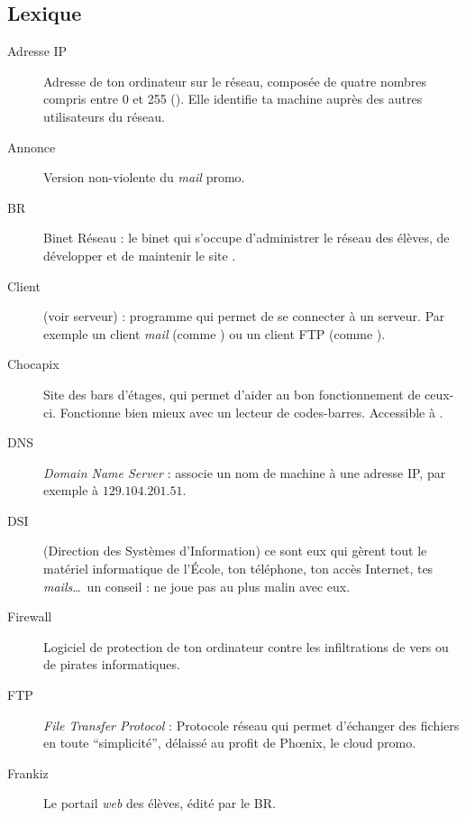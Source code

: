 \subsection{Lexique}


\begin{description}
  \item[Adresse IP] Adresse de ton ordinateur sur le réseau, composée de quatre nombres compris entre 0 et 255  (). Elle identifie ta machine auprès des autres utilisateurs du réseau.
  
  \item[Annonce] Version non-violente du \emph{mail} promo.
  
  \item[BR] Binet Réseau : le binet qui s'occupe d'administrer le réseau des élèves, de développer et de maintenir le site .

  \item[Client] (voir serveur) : programme qui permet de se connecter à un serveur. Par exemple un client \emph{mail}
	(comme ) ou un client FTP (comme ).

  \item[Chocapix] Site des bars d'étages, qui permet d'aider au bon fonctionnement de ceux-ci. Fonctionne bien mieux avec un lecteur de codes-barres. Accessible à .
  
  \item[DNS] \emph{Domain Name Server} : associe un nom de machine à une adresse IP, par exemple  à  $129.104.201.51$.
  
  \item[DSI] (Direction des Systèmes d'Information) ce sont eux qui gèrent tout le matériel informatique de l'École, ton téléphone, ton accès Internet, tes \emph{mails}\ldots\ un conseil : ne joue pas au plus malin avec eux.

  \item[Firewall] Logiciel de protection de ton ordinateur contre les infiltrations de vers ou de pirates informatiques.
  
  \item[FTP] \emph{File Transfer Protocol} : Protocole réseau qui permet d'échanger des fichiers en toute “simplicité”, délaissé au profit de Phœnix, le cloud promo.

  \item[Frankiz] Le portail \emph{web} des élèves, édité par le BR.
  

\end{description}
